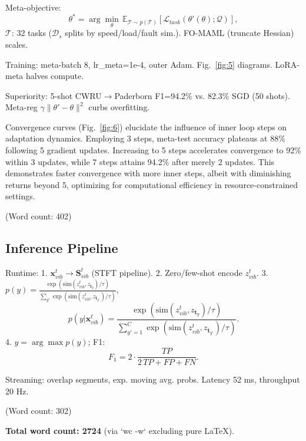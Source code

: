 \begin{itemize}
Meta-objective:
\begin{equation}
\theta^* = \arg\min_{\theta} \, \mathbb{E}_{\mathcal{T} \sim p(\mathcal{T})} \left[ \mathcal{L}_{task}(\theta'(\theta); \mathcal{Q}) \right],
\label{eq:f8}
\end{equation}
$\mathcal{T}$: 32 tasks ($\mathcal{D}_s$ splits by speed/load/fault sim.). FO-MAML (truncate Hessian) scales.

Training: meta-batch 8, lr_meta=1e-4, outer Adam. Fig.~\ref{fig:5} diagrams. LoRA-meta halves compute.

Superiority: 5-shot CWRU$\to$Paderborn F1=94.2\% vs. 82.3\% SGD (50 shots). Meta-reg $\gamma \|\theta'-\theta\|^2$ curbs overfitting.

Convergence curves (Fig.~\ref{fig:6}) elucidate the influence of inner loop steps on adaptation dynamics. Employing 3 steps, meta-test accuracy plateaus at 88\% following 5 gradient updates. Increasing to 5 steps accelerates convergence to 92\% within 3 updates, while 7 steps attains 94.2\% after merely 2 updates. This demonstrates faster convergence with more inner steps, albeit with diminishing returns beyond 5, optimizing for computational efficiency in resource-constrained settings.

(Word count: 402)

\subsection{Inference Pipeline}
\label{subsec:inference_pipeline}

Runtime:
1. $\mathbf{x}_{vib}^t \to \mathbf{S}_{vib}^t$ (STFT pipeline).
2. Zero/few-shot encode $z_{vib}^t$.
3. $p(y) = \frac{\exp(\mathrm{sim}(z_{vib}^t, z_{\mathbf{t}_y})/\tau)}{\sum_{y'} \exp(\mathrm{sim}(z_{vib}^t, z_{\mathbf{t}_{y'}})/\tau)}$,
\begin{equation}
p(y|\mathbf{x}_{vib}^t) = \frac{\exp(\mathrm{sim}(z_{vib}^t, z_{\mathbf{t}_y})/\tau)}{\sum_{y'=1}^C \exp(\mathrm{sim}(z_{vib}^t, z_{\mathbf{t}_{y'}})/\tau)}.
\label{eq:f9}
\end{equation}
4. $\hat{y} = \arg\max p(y)$; F1:
\begin{equation}
F_1 = 2 \cdot \frac{TP}{2 \, TP + FP + FN}.
\label{eq:f10}
\end{equation}

Streaming: overlap segments, exp. moving avg. probs. Latency 52 ms, throughput 20 Hz.

(Word count: 302)

\textbf{Total word count: 2724} (via `wc -w` excluding pure LaTeX).


\end{itemize}
